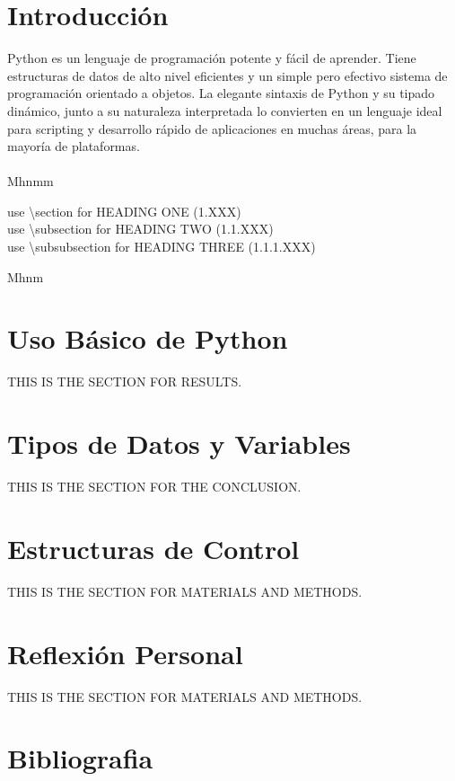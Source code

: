\documentclass[a4paper, 12pt]{article}
\begin{document}

\clearpage
\tableofcontents
\listoffigures
\listoftables
\clearpage

\pagestyle{fancy}

\section{Introducción}
Python es un lenguaje de programación potente y fácil de aprender. Tiene estructuras de datos de alto nivel eficientes y un simple pero efectivo sistema de programación orientado a objetos. La elegante sintaxis de Python y su tipado dinámico, junto a su naturaleza interpretada lo convierten en un lenguaje ideal para scripting y desarrollo rápido de aplicaciones en muchas áreas, para la mayoría de plataformas.\cite{DocumentationPython}\\
\\
Mhnmm

use \textbackslash section for HEADING ONE (1.XXX)\\
use \textbackslash subsection for HEADING TWO (1.1.XXX)\\
use \textbackslash subsubsection for HEADING THREE (1.1.1.XXX)

Mhnm

\clearpage
\section{Uso Básico de Python}
THIS IS THE SECTION FOR RESULTS. 

\clearpage
\section{Tipos de Datos y Variables}
THIS IS THE SECTION FOR THE CONCLUSION.

\clearpage
\section{Estructuras de Control}
THIS IS THE SECTION FOR MATERIALS AND METHODS.

\clearpage
\section{Reflexión Personal}
THIS IS THE SECTION FOR MATERIALS AND METHODS.

\clearpage
\section{Bibliografia}
\printbibliography
\end{document}
